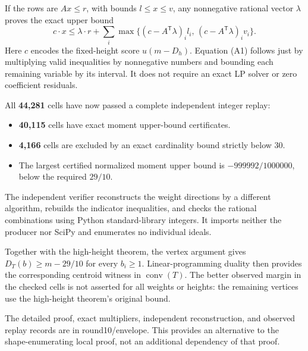 \documentclass[
  11pt,
  a4paper,
]{article}
\providecommand{\tightlist}{%
  \setlength{\itemsep}{0pt}\setlength{\parskip}{0pt}}
\begin{document}
If the rows are \(Ax\le r\), with bounds \(l\le x\le v\), any
nonnegative rational vector \(\lambda\) proves the exact upper bound \[
c\cdot x\le
\lambda\cdot r+
\sum_i\max\{(c-A^\mathsf T\lambda)_i l_i,\,
             (c-A^\mathsf T\lambda)_i v_i\}.
\tag{A1}
\] Here \(c\) encodes the fixed-height score \(u(m-D_h)\). Equation (A1)
follows just by multiplying valid inequalities by nonnegative numbers
and bounding each remaining variable by its interval. It does not
require an exact LP solver or zero coefficient residuals.

All \textbf{44,281} cells have now passed a complete independent integer
replay:

\begin{itemize}
\tightlist
\item
  \textbf{40,115} cells have exact moment upper-bound certificates.
\item
  \textbf{4,166} cells are excluded by an exact cardinality bound
  strictly below 30.
\item
  The largest certified normalized moment upper bound is
  \(-999992/1000000\), below the required \(29/10\).
\end{itemize}

The independent verifier reconstructs the weight directions by a
different algorithm, rebuilds the indicator inequalities, and checks the
rational combinations using Python standard-library integers. It imports
neither the producer nor SciPy and enumerates no individual ideals.

Together with the high-height theorem, the vertex argument gives
\(D_T(b)\ge m-29/10\) for every \(b_i\ge1\). Linear-programming duality
then provides the corresponding centroid witness in
\(\operatorname{conv}(T)\). The better observed margin in the checked
cells is not asserted for all weights or heights: the remaining vertices
use the high-height theorem's original bound.

The detailed proof, exact multipliers, independent reconstruction, and
observed replay records are in round10/envelope. This provides an
alternative to the shape-enumerating local proof, not an additional
dependency of that proof.
\end{document}
